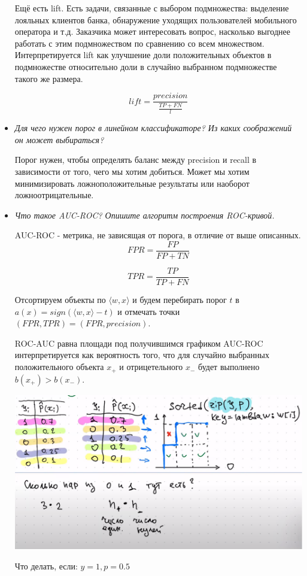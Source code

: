 \documentclass[12pt]{article}
\begin{document}
\begin{itemize}
Ещё есть lift. Есть задачи, связанные с выбором подмножества: выделение лояльных клиентов банка, обнаружение уходящих пользователей мобильного оператора и т.д. Заказчика может интересовать вопрос, насколько выгоднее работать с этим подмножеством по сравнению со всем множеством.
Интерпретируется lift как улучшение доли положительных объектов в подмножестве относительно доли в случайно выбранном подмножестве такого же размера.

\[ lift = \frac{precision}{\frac{TP+FN}{l}} \]

\item \textit{Для чего нужен порог в линейном классификаторе? Из каких соображений он может
выбираться?}

Порог нужен, чтобы определять баланс между precision и recall в зависимости от того, чего мы хотим добиться.
Может мы хотим минимизировать ложноположительные результаты или наоборот ложноотрицательные.

\item \textit{Что такое AUC-ROC? Опишите алгоритм построения ROC-кривой.}

AUC-ROC - метрика, не зависящая от порога, в отличие от выше описанных.
\[ FPR = \frac{FP}{FP+TN} \]

\[ TPR = \frac{TP}{TP+FN} \]

Отсортируем объекты по $\langle w, x \rangle$ и будем перебирать порог $t$ в $a(x) = sign(\langle w, x \rangle - t)$ и отмечать точки $(FPR, TPR) = (FPR, precision)$.

ROC-AUC равна площади под получившимся графиком
AUC-ROC интерпретируется как вероятность того, что для случайно выбранных положительного объекта $x_+$ и отрицетельного $x_-$ будет выполнено $b(x_+) > b(x_-)$.


\includegraphics[width=18cm]{auc-roc.png}

Что делать, если:
$y = 1, p  = 0.5$


\end{itemize}
\end{document}

